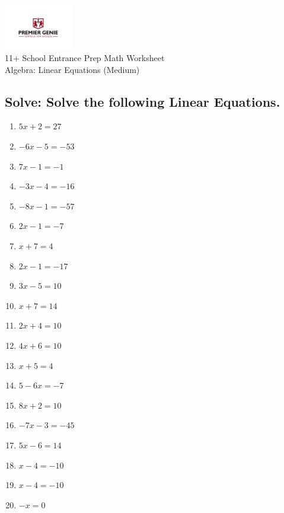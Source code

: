 \documentclass{article}
\begin{document}
\begin{center}
\includegraphics[width=3cm]{PREMGENIEJPG.jpg}\\
{\Large 11+ School Entrance Prep Math Worksheet}\\
{\Medium Algebra: Linear Equations (Medium)}\\

\end{center}

\subsection*{Solve: Solve the following Linear Equations.}

\begin{enumerate}
\item $\displaystyle 5 x + 2=27 $ \ 
\item $\displaystyle - 6 x - 5=-53 $ \ 
\item $\displaystyle 7 x - 1=-1 $ \ 
\item $\displaystyle - 3 x - 4=-16 $ \ 
\item $\displaystyle - 8 x - 1=-57 $ \ 
\item $\displaystyle 2 x - 1=-7 $ \ 
\item $\displaystyle x + 7=4 $ \ 
\item $\displaystyle 2 x - 1=-17 $ \ 
\item $\displaystyle 3 x - 5=10 $ \ 
\item $\displaystyle x + 7=14 $ \ 
\item $\displaystyle 2 x + 4=10 $ \ 
\item $\displaystyle 4 x + 6=10 $ \ 
\item $\displaystyle x + 5=4 $ \ 
\item $\displaystyle 5 - 6 x=-7 $ \ 
\item $\displaystyle 8 x + 2=10 $ \ 
\item $\displaystyle - 7 x - 3=-45 $ \ 
\item $\displaystyle 5 x - 6=14 $ \ 
\item $\displaystyle x - 4=-10 $ \ 
\item $\displaystyle x - 4=-10 $ \ 
\item $\displaystyle - x=0 $ \ 


\end{enumerate}
\end{document}
